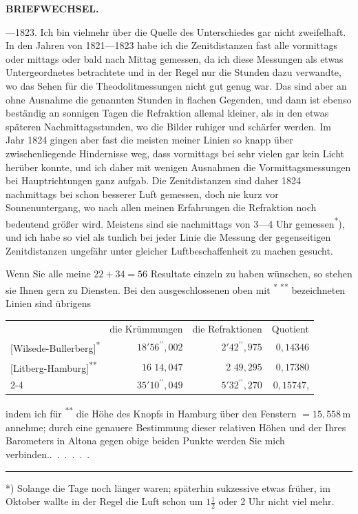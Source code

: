 \par\clearpage
\noindent{}\hfill{\small\textbf{BRIEFWECHSEL.}}\hfill\null\par\medskip
{}---1823. Ich bin vielmehr über die Quelle des Unterschiedes gar nicht
zweifelhaft. In den Jahren von 1821---1823 habe ich die Zenitdistanzen fast
alle vormittags oder mittags oder bald nach Mittag gemessen, da ich diese Messungen als etwas Untergeordnetes betrachtete und in der Regel nur die Stunden
dazu verwandte, wo das Sehen für die Theodolitmessungen nicht gut
genug war. Das sind aber an  ohne Ausnahme die genannten Stunden in flachen Gegenden, und dann ist ebenso beständig an
sonnigen Tagen die Refraktion allemal kleiner, als in den etwas späteren Nachmittagsstunden, wo die Bilder ruhiger und schärfer werden. Im Jahr 1824
gingen aber fast die meisten meiner Linien so knapp über zwischenliegende
Hindernisse weg, dass vormittags bei sehr vielen gar kein Licht herüber
konnte, und ich daher mit wenigen Ausnahmen die Vormittagsmessungen bei
Hauptrichtungen ganz aufgab. Die Zenitdistanzen sind daher 1824  nachmittags bei schon besserer Luft gemessen, doch nie kurz vor Sonnenuntergang, wo nach allen meinen Erfahrungen die Refraktion noch bedeutend
größer wird. Meistens sind sie nachmittags von 3---4 Uhr gemessen\textsuperscript{*}), und
ich habe so viel als tunlich bei jeder Linie die Messung der gegenseitigen
Zenitdistanzen ungefähr unter gleicher Luftbeschaffenheit zu machen gesucht.
\par\noindent\hspace*{\parindent}Wenn Sie alle meine \(22+34=56\) Resultate einzeln zu haben wünschen,
so stehen sie Ihnen gern zu Diensten. Bei den ausgeschlossenen oben mit \textsuperscript{* **}
bezeichneten Linien sind übrigens
\begin{center}
\setlength{\tabcolsep}{4pt}
\begin{tabular}{lrrr}
& die Krümmungen & die Refraktionen & Quotient\\
{}[Wilsede-Bullerberg]\textsuperscript{*} &\(18'56^{\prime\prime}{,}002\)&\(2'42^{\prime\prime}{,}975\)&\(0{,}14346\)\\
{}[Litberg-Hamburg]\textsuperscript{**} &\(16\phantom{' }14{,}047\)&\(2\phantom{' }49{,}295\)&\(0{,}17380\)\\\cline{2-4}
\multicolumn{1}{r}{Summe}&\(35'10^{\prime\prime}{,}049\)&\(5'32^{\prime\prime}{,}270\)&\(0{,}15747\),
\end{tabular}
\end{center}
\noindent indem ich für \textsuperscript{**} die Höhe des Knopfs in Hamburg über den Fenstern
\(=15{,}558\,\mathrm{m}\) annehme; durch eine genauere Bestimmung dieser relativen Höhen
und der Ihres Barometers in Altona gegen obige beiden Punkte werden Sie
mich verbinden.\quad\mbox{.\ .\ .\ .\ .\ .}
\par\medskip\noindent\rule{.25\linewidth}{.4pt}\par
{\small\noindent\hspace*{\parindent}*) Solange die Tage noch länger waren; späterhin sukzessive etwas früher, im Oktober wallte in
der Regel die Luft schon um \(1\frac{1}{2}\) oder 2 Uhr nicht viel mehr.\par}
